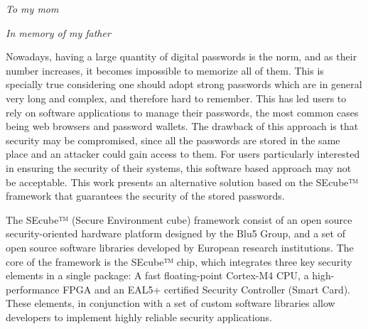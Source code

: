 \documentclass[%
    corpo=13pt,
    twoside,
    oldstyle,
    autoretitolo,
    greek,
    evenboxes,
    numerazioneromana,
    tipotesi=magistrale,
]{toptesi}
\begin{document}
 \frontespizio %
 
%
   

\frontmatter


\begin{flushright}
\vspace*{30pt}
\noindent
{\Large\textit{To my mom}}

{\Large\textit{\textdagger \hspace{1pt} In memory of my father}}

\end{flushright}
\listoftodos

\sommario

Nowadays, having a large quantity of digital passwords is the norm, and as their number increases, it becomes impossible to memorize all of them. This is specially true considering one should adopt strong passwords which are in general very long and complex, and therefore hard to remember. This has led users to rely on software applications to manage their passwords, the most common cases being web browsers and password wallets. The drawback of this approach is that security may be compromised, since all the passwords are stored in the same place and an attacker could gain access to them. For users particularly interested in ensuring the security of their systems, this software based approach may not be acceptable. This work presents an alternative solution based on the SEcube™ framework that guarantees the security of the stored passwords.

The SEcube™ (Secure Environment cube) framework consist of an open source security-oriented hardware platform designed by the Blu5 Group, and a set of open source software libraries developed by European research institutions. The core of the framework is the SEcube™ chip, which integrates three key security elements in a single package: A fast floating-point Cortex-M4 CPU, a high-performance FPGA and an EAL5+ certified Security Controller (Smart Card). These elements, in conjunction with a set of custom software libraries allow developers to implement highly reliable security applications.
\end{document}
